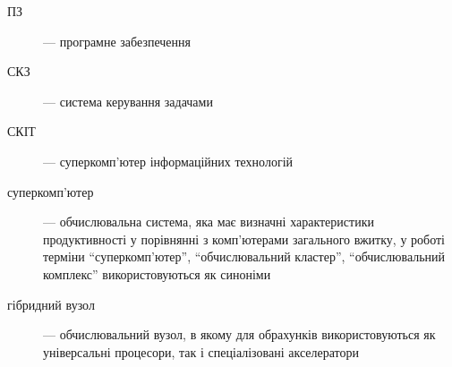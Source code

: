 \begin{description}
\item[ПЗ] --- програмне забезпечення
\item[СКЗ] --- система керування задачами
\item[СКІТ] --- суперкомп'ютер інформаційних технологій
\item[суперкомп'ютер] --- обчислювальна система, яка має визначні характеристики продуктивності у порівнянні з комп'ютерами загального вжитку, у роботі терміни ``суперкомп'ютер'', ``обчислювальний кластер'', ``обчислювальний комплекс'' використовуються як синоніми
\item[гібридний вузол] --- обчислювальний вузол, в якому для обрахунків використовуються як універсальні процесори, так і спеціалізовані акселератори
\end{description}